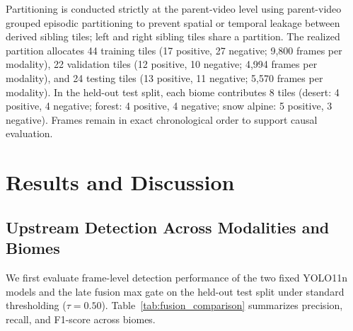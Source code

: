 \documentclass[conference]{IEEEtran}
\begin{document}
Partitioning is conducted strictly at the parent-video level using parent-video grouped episodic partitioning to prevent spatial or temporal leakage between derived sibling tiles; left and right sibling tiles share a partition. The realized partition allocates 44 training tiles (17 positive, 27 negative; 9,800 frames per modality), 22 validation tiles (12 positive, 10 negative; 4,994 frames per modality), and 24 testing tiles (13 positive, 11 negative; 5,570 frames per modality). In the held-out test split, each biome contributes 8 tiles (desert: 4 positive, 4 negative; forest: 4 positive, 4 negative; snow alpine: 5 positive, 3 negative). Frames remain in exact chronological order to support causal evaluation.

\section{Results and Discussion}

\subsection{Upstream Detection Across Modalities and Biomes}
We first evaluate frame-level detection performance of the two fixed YOLO11n models and the late fusion max gate on the held-out test split under standard thresholding ($\tau = 0.50$). Table~\ref{tab:fusion_comparison} summarizes precision, recall, and F1-score across biomes.
\end{document}
